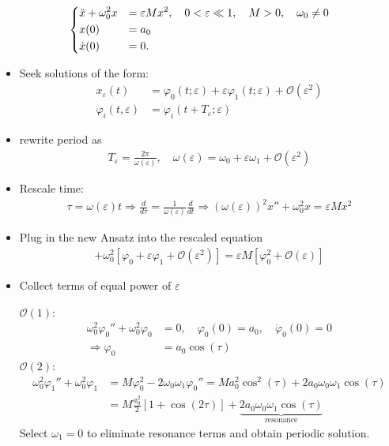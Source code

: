 \begin{solution}[2.3]
\begin{align}
	\begin{dcases}
	\ddot{x} + \omega_0^2 x &= \varepsilon Mx^2, \quad 0 < \varepsilon \ll 1, \quad M>0, \quad \omega_0 \neq 0 \\
	x(0) &= a_0 \\
	\dot{x}(0) &= 0.
	\end{dcases}
\end{align}
\begin{itemize}
	\item Seek solutions of the form:
		\begin{align}
			x_\varepsilon(t) &= \varphi_0(t;\varepsilon) + \varepsilon\varphi_1(t;\varepsilon) + \mathcal{O}(\varepsilon^2) \\
			\varphi_i (t, \varepsilon) &= \varphi_i(t + T_\varepsilon; \varepsilon)
		\end{align}
	\item rewrite period as
		\begin{align}
			T_\varepsilon = \frac{2\pi}{\omega(\varepsilon)}, \quad \omega(\varepsilon) = \omega_0 + \varepsilon \omega_1 + \mathcal{O}(\varepsilon^2)
		\end{align}
	\item Rescale time: 
		\begin{align}
			\tau = \omega(\varepsilon)t \Longrightarrow \boxed{\frac{d}{d\tau} = \frac{1}{\omega(\varepsilon)}\frac{d}{dt}} \Longrightarrow \boxed{\left(\omega(\varepsilon)\right)^2x''+\omega_0^2 x = \varepsilon M x^2}
		\end{align}
	\item Plug in the new Ansatz into the rescaled equation
		\begin{align}
			[\omega_0^2 + 2\varepsilon \omega_0 \omega_1 + \mathcal{O}(\varepsilon^2)][\varphi_0'' + \varepsilon \varphi_1''+ \mathcal{O}(\varepsilon^2)] + \omega_0^2[\varphi_0 + \varepsilon \varphi_1+ \mathcal{O}(\varepsilon^2)] = \varepsilon M [\varphi_0^2 + \mathcal{O}(\varepsilon)]
		\end{align}
	\item Collect terms of equal power of $\varepsilon$
	
	$\mathcal{O}(1)$:
	\begin{align}
		\omega_0^2\varphi_0'' + \omega_0^2 \varphi_0 &= 0, \quad \varphi_0(0) = a_0, \quad \dot{\varphi}_0(0)=0 \\
		\Longrightarrow \varphi_0 &= a_0 \cos(\tau)
	\end{align}
	$\mathcal{O}(2)$:
	\begin{align}
		\omega_0^2\varphi_1'' + \omega_0^2 \varphi_1 &= M \varphi_0^2 - 2\omega_0\omega_1\varphi_0'' = Ma_0^2 \cos^2(\tau) + 2a_0\omega_0\omega_1 \cos(\tau) \\
		&= M \frac{a_0^2}{2}[1 + \cos(2\tau)] + \underbrace{2a_0\omega_0\omega_1\cos(\tau)}_{\text{resonance}}
	\end{align}
	Select $\omega_1 = 0$ to eliminate resonance terms and obtain periodic solution.
	

\end{itemize}
\end{solution}
